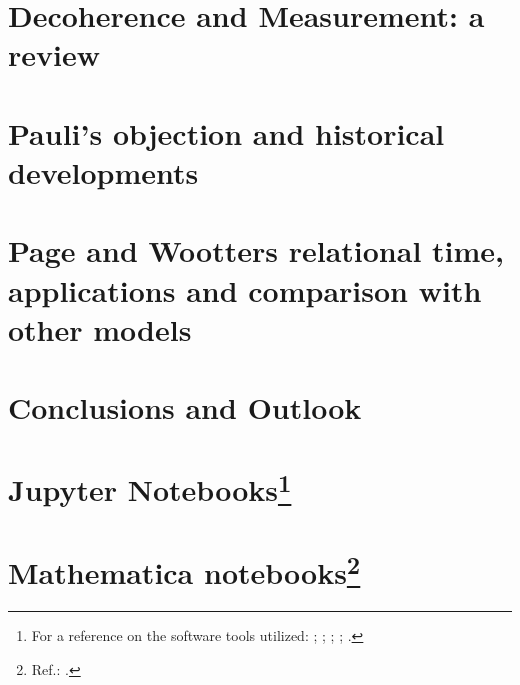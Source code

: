 \chapter{Decoherence and Measurement: a review}\label{ch:decohere}









\chapter{Pauli's objection and historical developments}\label{ch:hist}






\chapter[%
  Page and Wootters relational time and applications
  ]{
    Page and Wootters relational time, applications and comparison with other models
  }
  \label{ch:pw}\label{ch:detect}








\chapter{Conclusions and Outlook}\label{ch:outlook}




\appendix

\chapter[Jupyter Notebooks]{Jupyter Notebooks\footnote{
  For a reference on the software tools utilized:
  \cite{comp:scipy};
  \cite{comp:sympy};
  \cite{comp:jupyter};
  \cite{comp:matplotlib};
  \cite{comp:numpy}.
}}






\chapter[Mathematica notebooks]{Mathematica notebooks\footnote{
  Ref.: \cite{Wolfram}.
}}



\printbibliography[heading=bibintoc]


